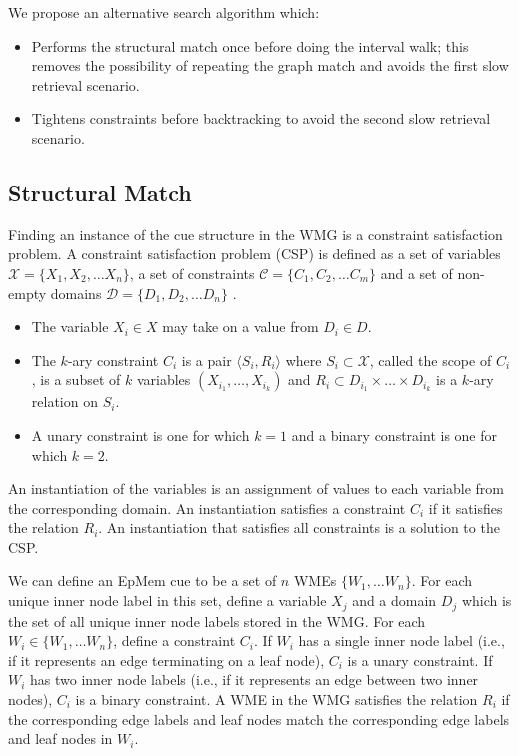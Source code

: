 \documentclass[envcountsame]{llncs}
\begin{document}
  We propose an alternative search algorithm which:
  \begin{itemize}
    \item
      Performs the structural match once before doing the interval walk; this removes the possibility of repeating the graph match and avoids the first slow retrieval scenario.
    \item
      Tightens constraints before backtracking to avoid the second slow retrieval scenario.
  \end{itemize}
  
  \subsection{Structural Match}
  \label{sec:newstructural}
  Finding an instance of the cue structure in the WMG is a constraint satisfaction problem.
  A constraint satisfaction problem (CSP) is defined as a set of variables $\mathcal{X}=\{X_1, X_2, \dots X_n\}$, a set of constraints $\mathcal{C} = \{C_1, C_2, \dots C_m\}$ and a set of non-empty domains $\mathcal{D}=\{D_1, D_2, \dots D_n\}$ \cite{dechter2003constraint}.
  
  \begin{itemize}
    \item The variable $X_i\in X$ may take on a value from $D_i\in D$.
    \item The $k$-ary constraint $C_i$ is a pair $\langle S_i, R_i\rangle$ where $S_i \subset \mathcal{X}$, called the scope of $C_i$, is a
      subset of $k$ variables $(X_{i_1}, \dots, X_{i_k})$ and
      $R_i \subset D_{i_1}\times \dots \times D_{i_k}$ is a $k$-ary relation on $S_i$.
    \item A unary constraint is one for which $k=1$ and a binary constraint is one for which $k=2$.
  \end{itemize}
  
  An instantiation of the variables is an assignment of values to each variable from the corresponding
  domain. An instantiation satisfies a constraint $C_i$ if it satisfies the relation $R_i$. An instantiation that
  satisfies all constraints is a solution to the CSP.
  
  We can define an EpMem cue to be a set of $n$ WMEs $\{W_1, \dots W_n\}$.
  For each unique inner node label in this set, define a variable $X_j$ and a domain $D_j$ which is the set of all unique inner node labels stored in the WMG.
  For each $W_i\in\{W_1, \dots W_n\}$, define a constraint $C_i$.
  If $W_i$ has a single inner node label (i.e., if it represents an edge terminating on a leaf node), $C_i$ is a unary constraint.
  If $W_i$ has two inner node labels (i.e., if it represents an edge between two inner nodes), $C_i$ is a binary constraint.
  A WME in the WMG satisfies the relation $R_i$ if the corresponding edge labels and leaf nodes match the corresponding edge labels and leaf nodes in $W_i$.
\end{document}
